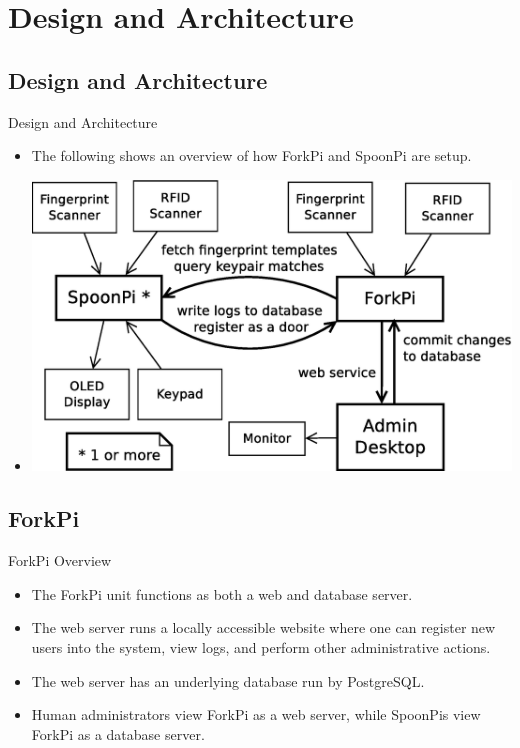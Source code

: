 \section{Design and Architecture}
\subsection{Design and Architecture}
\begin{frame}{Design and Architecture}
\begin{itemize}
    \item<1-> The following shows an overview of how ForkPi and SpoonPi are setup.
    \item<2-> \includegraphics[scale=0.5]{architecture.eps}
\end{itemize}
\end{frame}

\subsection{ForkPi}
\begin{frame}{ForkPi Overview}
\begin{itemize}
    \item<1-> The ForkPi unit functions as both a web and database server.
    \item<2-> The web server runs a locally accessible website where one can register new users into the system, view logs, and perform other administrative actions.
    \item<3-> The web server has an underlying database run by PostgreSQL.
    \item<4-> Human administrators view ForkPi as a web server, while SpoonPis view ForkPi as a database server.
\end{itemize}
\end{frame}


